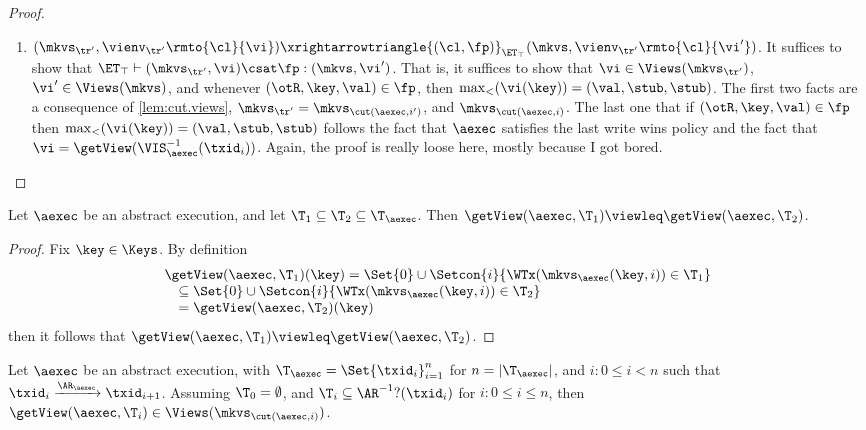 \begin{proof}
\begin{itemize}
\begin{enumerate}
\item $(\mkvs_{\tr'}, \vienv_{\tr'}\rmto{\cl}{\vi}) \xrightarrowtriangle{(\cl, \fp)}_{\ET_{\top}} (\mkvs,  \vienv_{\tr'}\rmto{\cl}{\vi'})$. 
    It suffices to show that $\ET_{\top} \vdash (\mkvs_{\tr'}, \vi) \csat \fp: (\mkvs,\vi')$. 
That is, it suffices to show that $\vi \in \Views(\mkvs_{\tr'})$, $\vi' \in \Views(\mkvs)$, 
and whenever $(\otR, \key, \val) \in \fp$, then $\max_{<}(\vi(\key)) = (\val, \stub, \stub)$. 
The first two facts are a consequence of \cref{lem:cut.views}, $\mkvs_{\tr'} = \mkvs_{\cut(\aexec, i')}$, and  $\mkvs_{\cut(\aexec, i)}$. 
The last one that if $(\otR, \key, \val) \in \fp$ then $\max_{<}(\vi(\key)) = (\val, \stub, \stub)$ follows the fact that 
$\aexec$ satisfies the last write wins policy and the fact that $\vi = \getView(\VIS^{-1}_{\aexec}(\txid_{i}))$.
\ac{Again, the proof is really loose here, mostly because I got bored.}
\end{enumerate} 

\end{itemize}
\end{proof}

\begin{lemma}
\label{lem:getView.monotone}
Let $\aexec$ be an abstract execution, and let $\T_1 \subseteq \T_2 \subseteq \T_{\aexec}$. 
Then $\getView(\aexec, \T_1) \viewleq \getView(\aexec, \T_2)$.
\end{lemma}
\begin{proof}
Fix $\key \in \Keys$. By definition  
\[
\begin{array}{l}
    \getView(\aexec, \T_1)(\key) = \Set{0} \cup \Setcon{ i }{\WTx(\mkvs_{\aexec}(\key, i)) \in \T_1} \\
    \quad \subseteq \Set{0} \cup \Setcon{i }{ \WTx(\mkvs_{\aexec}(\key, i)) \in \T_2} \\
\quad = \getView(\aexec, \T_2)(\key)
\end{array}
\]
then it follows that  $\getView(\aexec, \T_1) \viewleq \getView(\aexec, \T_2)$.
\end{proof}

\begin{lemma}
\label{lem:cut.views}
Let $\aexec$ be an abstract execution, with $\T_{\aexec} = \Set{\txid_{i}}_{i = 1}^{n}$ for 
$n = \lvert \T_{\aexec} \rvert$, and \( i : 0 \leq i < n\) such that $\txid_{i} \xrightarrow{\AR_{\aexec}} \txid_{i+1}$.
Assuming $\T_{0} = \emptyset$, and $\T_{i} \subseteq \AR^{-1}?(\txid_{i})$ for $i : 0 \leq i \leq n$,
then $\getView(\aexec, \T_{i}) \in \Views(\mkvs_{\cut(\aexec, i)})$.
\end{lemma}

